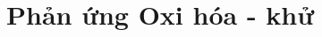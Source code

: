 \documentclass[Main.tex]{subfiles}
\begin{document}
	\setcounter{chapter}{3}
	\chapter{Phản ứng Oxi hóa - khử}
	\tatloigiai
	
%	
%	
%	
\end{document}

